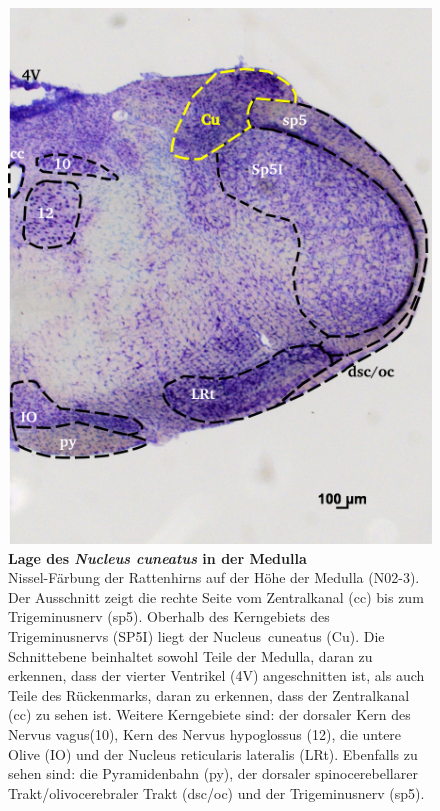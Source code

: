 \documentclass[12pt,a4paper,pdftex]{article}
\begin{document}
\begin{figure}[H]
    \centering
    \includegraphics{pictures/somatosensory/nucleus_cuneatus.png}
    \caption[Lage des \textit{Nucleus cuneatus} in der Medulla]{\textbf{Lage des \textit{Nucleus cuneatus} in der Medulla}\\
    Nissel-Färbung der Rattenhirns auf der Höhe der Medulla (N02-3). Der Ausschnitt zeigt die rechte Seite vom Zentralkanal (cc) bis zum Trigeminusnerv (sp5). Oberhalb des Kerngebiets des Trigeminusnervs (SP5I) liegt der Nucleus~cuneatus (Cu). Die Schnittebene beinhaltet sowohl Teile der Medulla, daran zu erkennen, dass der vierter Ventrikel (4V) angeschnitten ist, als auch Teile des Rückenmarks, daran zu erkennen, dass der Zentralkanal (cc) zu sehen ist. Weitere Kerngebiete sind: der dorsaler Kern des Nervus vagus(10), Kern des Nervus hypoglossus (12), die untere Olive (IO) und der Nucleus reticularis lateralis (LRt). Ebenfalls zu sehen sind: die Pyramidenbahn (py), der dorsaler spinocerebellarer Trakt/olivocerebraler Trakt (dsc/oc) und der Trigeminusnerv (sp5).}
    \label{fig:nucleus_cuneatus}
\end{figure}
\end{document}
